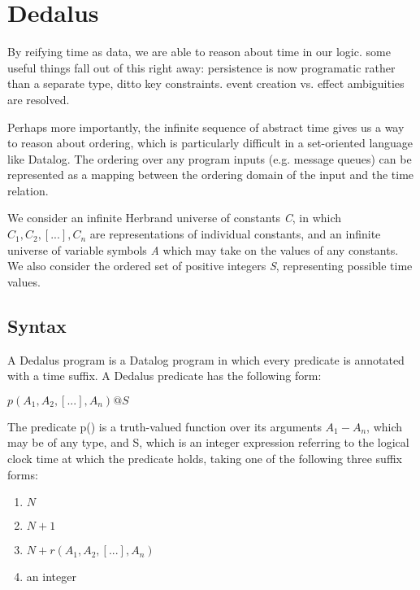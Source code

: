 \section{Dedalus}

By reifying time as data, we are able to reason about time in our logic.  some useful things fall out of this right away: persistence is now programatic rather than a separate type, ditto key constraints.  event creation vs. effect ambiguities are resolved.

Perhaps more importantly, the infinite sequence of abstract time gives us a way to reason about ordering, which is particularly difficult in a set-oriented language like Datalog.  The ordering over any program inputs (e.g. message queues) can be represented as a mapping between the ordering domain of the input and the time relation.

We consider an infinite Herbrand universe of constants \emph{C}, in which $C_{1}, C_{2}, [...], C_{n}$ are representations of individual constants,
and an infinite universe of variable symbols \emph{A} which may take on the values of any constants.   We also consider the ordered set
of positive integers \emph{S}, representing possible time values.

\subsection{Syntax}

A Dedalus program is a Datalog program in which every predicate is annotated with a time suffix.  A Dedalus predicate has the following form:

$p(A_{1}, A_{2}, [...], A_{n})@S$

The predicate p() is a truth-valued function over its arguments $A_{1} - A_{n}$, which may be of any type, and S, which is an integer expression 
referring to the logical clock time at which the predicate holds, taking one of the following three suffix forms:

\begin{enumerate}
\item $N$
\item $N + 1$
\item $N + r(A_{1}, A_{2}, [...], A_{n})$
\item an integer
\end{enumerate}

